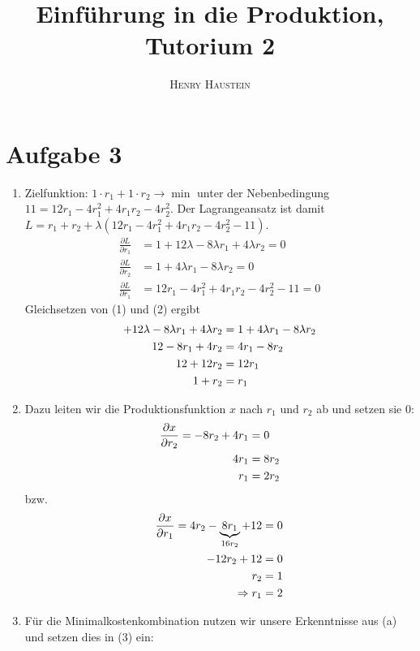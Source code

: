 \documentclass{article}
\title{\textbf{Einführung in die Produktion, Tutorium 2}}
\author{\textsc{Henry Haustein}}
\date{}
\begin{document}
	\maketitle
	
	\section*{Aufgabe 3}
	\begin{enumerate}[label=(\alph*)]
		\item Zielfunktion: $1\cdot r_1 + 1\cdot r_2 \to \min$ unter der Nebenbedingung $11=12r_1 - 4r_1^2 + 4r_1r_2 - 4r_2^2$. Der Lagrangeansatz ist damit $L = r_1+r_2+\lambda (12r_1-4r_1^2 + 4r_1r_2 - 4r_2^2 - 11)$.
		\begin{align}
			\frac{\partial L}{\partial r_1} &= 1 + 12\lambda - 8\lambda r_1 + 4\lambda r_2 = 0 \\
			\frac{\partial L}{\partial r_2} &= 1 + 4\lambda r_1 - 8\lambda r_2 = 0 \\
			\frac{\partial L}{\partial r_1} &= 12r_1-4r_1^2 + 4r_1r_2 - 4r_2^2 - 11 = 0
		\end{align}
		Gleichsetzen von (1) und (2) ergibt
		\begin{align}
			 + 12\lambda - 8\lambda r_1 + 4\lambda r_2 &= 1 + 4\lambda r_1 - 8\lambda r_2 \notag \\
			 12 - 8r_1 + 4r_2 &= 4r_1 - 8r_2 \notag \\
			 12 + 12r_2 &= 12r_1 \notag \\
			 1 + r_2 &= r_1 \notag
		\end{align}
		\item Dazu leiten wir die Produktionsfunktion $x$ nach $r_1$ und $r_2$ ab und setzen sie 0:
		\begin{align}
			\frac{\partial x}{\partial r_2} = -8r_2 + 4r_1 &= 0 \notag \\
			4r_1 &= 8r_2 \notag \\
			r_1 &= 2 r_2 \notag
		\end{align}
		bzw.
		\begin{align}
			\frac{\partial x}{\partial r_1} = 4r_2 - \underbrace{8r_1}_{16r_2} + 12 &= 0 \notag \\
			-12 r_2 + 12 &= 0 \notag \\
			r_2 &= 1 \notag \\
			\Rightarrow r_1 &= 2 \notag
		\end{align}
		\item Für die Minimalkostenkombination nutzen wir unsere Erkenntnisse aus (a) und setzen dies in (3) ein:

\end{enumerate}
\end{document}
